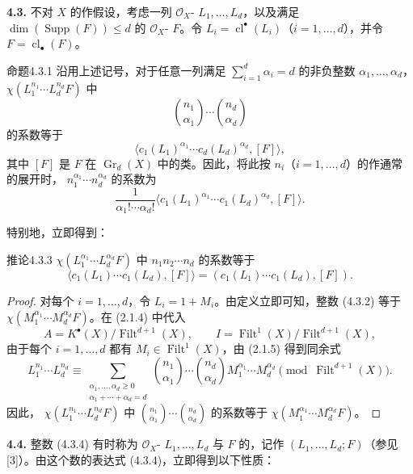 \textbf{4.3.} 不对 $X$ 的作假设，考虑一列 $\mathcal O_X$- $L_1,\ldots,L_d$，以及满足 $\dim(\operatorname{Supp}(F))\leq d$ 的 $\mathcal O_X$- $F$。令 $L_i=\operatorname{cl}^\bullet(L_i)$（$i=1,\ldots,d$），并令 $F=\operatorname{cl}_\bullet(F)$。
\begin{SGAresult}{命题}{4.3.1}
沿用上述记号，对于任意一列满足 $\sum_{i=1}^d\alpha_i=d$ 的非负整数 $\alpha_1,\ldots,\alpha_d$， $\chi(L_1^{n_1}\cdots L_d^{n_d}F)$ 中
\[\binom{n_1}{\alpha_1}\cdots\binom{n_d}{\alpha_d}\]
的系数等于
\[\langle c_1(L_1)^{\alpha_1}\cdots c_d(L_d)^{\alpha_d},[F]\rangle,\tag{4.3.2}\]
其中 $[F]$ 是 $F$ 在 $\operatorname{Gr}_d(X)$ 中的类。因此，将此按 $n_i$（$i=1,\ldots,d$）的作通常的展开时， $n_1^{\alpha_1}\cdots n_d^{\alpha_d}$ 的系数为
\[\frac1{\alpha_1!\cdots\alpha_d!}\langle c_1(L_1)^{\alpha_1}\cdots c_1(L_d)^{\alpha_d},[F]\rangle.\]
\end{SGAresult}
特别地，立即得到：
\begin{SGAresult}{推论}{4.3.3}
 $\chi(L_1^{\alpha_1}\cdots L_d^{\alpha_d}F)$ 中 $n_1n_2\cdots n_d$ 的系数等于
\[\langle c_1(L_1)\cdots c_1(L_d),[F]\rangle=(c_1(L_1)\cdots c_1(L_d),[F]).\tag{4.3.4}\]
\end{SGAresult}
\begin{proof}
对每个 $i=1,\ldots,d$，令 $L_i=1+M_i$。由定义立即可知，整数 (4.3.2) 等于 $\chi(M_1^{\alpha_1}\cdots M_d^{\alpha_d}F)$。在 (2.1.4) 中代入
\[A=K^\bullet(X)/\operatorname{Filt}^{d+1}(X),\qquad I=\operatorname{Filt}^1(X)/\operatorname{Filt}^{d+1}(X),\]
由于每个 $i=1,\ldots,d$ 都有 $M_i\in\operatorname{Filt}^1(X)$，由 (2.1.5) 得到同余式
\[L_1^{n_1}\cdots L_d^{n_d}\equiv\sum_{\substack{\alpha_1,\ldots,\alpha_d\geq0\\\alpha_1+\cdots+\alpha_d=d}}\binom{n_1}{\alpha_1}\cdots\binom{n_d}{\alpha_d}M_1^{\alpha_1}\cdots M_d^{\alpha_d}\pmod{\operatorname{Filt}^{d+1}(X)}.\tag{4.3.5}\]
因此， $\chi(L_1^{n_1}\cdots L_d^{n_d}F)$ 中 $\binom{n_1}{\alpha_1}\cdots\binom{n_d}{\alpha_d}$ 的系数等于 $\chi(M_1^{\alpha_1}\cdots M_d^{\alpha_d}F)$。
\end{proof}
\textbf{4.4.} 整数 (4.3.4) 有时称为 $\mathcal O_X$- $L_1,\ldots,L_d$ 与 $F$ 的，记作 $(L_1,\ldots,L_d;F)$（参见 [3]）。由这个数的表达式 (4.3.4)，立即得到以下性质：
